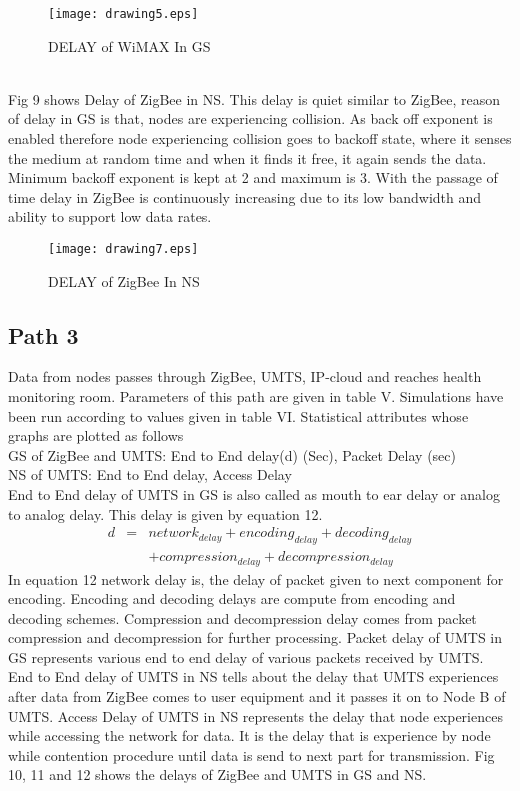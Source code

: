 \documentclass[11pt, conference, compsocconf, onecolumn]{IEEEtran}
\begin{document}
\begin{figure}[!b]
\centering
\caption{DELAY of WiMAX In GS}
\texttt{[image: drawing5.eps]}
\end{figure}
\\
\indent Fig 9 shows Delay of ZigBee in NS. This delay is quiet similar to ZigBee, reason of delay in GS is that, nodes are experiencing collision. As back off exponent is enabled therefore node experiencing collision goes to backoff state, where it senses the medium at random time and when it finds it free, it again sends the data. Minimum backoff exponent is kept at 2 and maximum is 3. With the passage of time delay in ZigBee is continuously increasing due to its low bandwidth and ability to support low data rates.
\begin{figure}[!h]
\centering
\caption{DELAY of ZigBee In NS}
\texttt{[image: drawing7.eps]}
\end{figure}
\subsection{Path 3}
Data from nodes passes through ZigBee, UMTS, IP-cloud and reaches health monitoring room. Parameters of this path are given in table V. Simulations have been run according to values given in table VI. Statistical attributes whose graphs are plotted as follows \\
\indent GS of ZigBee and UMTS: End to End delay(d) (Sec), Packet Delay (sec)\\
\indent NS of UMTS: End to End delay, Access Delay
\\
\indent End to End delay of UMTS in GS is also called as mouth to ear delay or analog to analog delay. This delay is given by equation 12.
\begin{eqnarray}
d&=&network_{delay}+encoding_{delay}+decoding_{delay} \nonumber \\
& & +compression_{delay} + decompression_{delay}
\end{eqnarray}
\indent In equation 12 network delay is, the delay of packet given to next component for encoding. Encoding and decoding delays are compute from encoding and decoding schemes. Compression and decompression delay comes from packet compression and decompression for further processing. Packet delay of UMTS in GS represents various end to end delay of various packets received by UMTS. \\
\indent End to End delay of UMTS in NS tells about the delay that UMTS experiences after data from ZigBee comes to user equipment and it passes it on to Node B of UMTS. Access Delay of UMTS in NS represents the delay that node experiences while accessing the network for data. It is the delay that is experience by node while contention procedure until data is send to next part for transmission. Fig 10, 11 and 12 shows the delays of ZigBee and UMTS in GS and NS.
\end{document}
